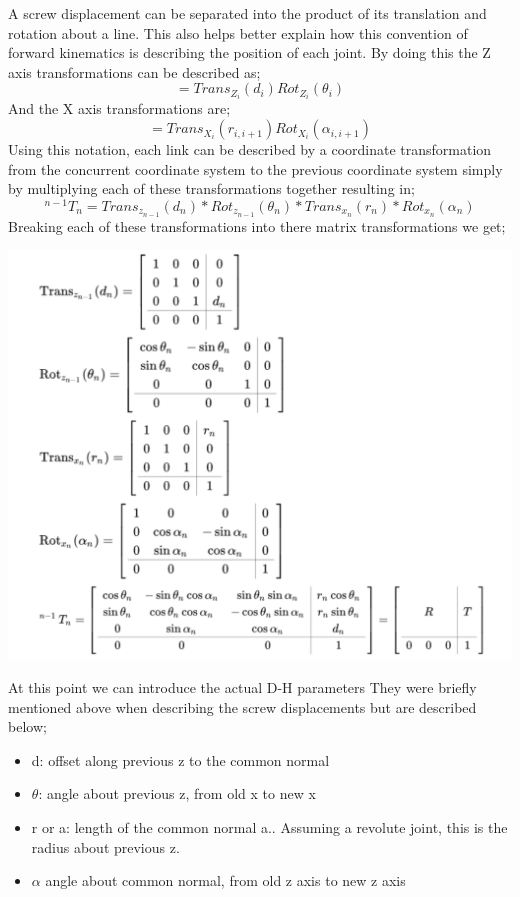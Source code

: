     A screw displacement can be separated into the product of its translation and rotation about a line. This also helps better explain how this convention of forward kinematics is describing the position of each joint. By doing this the Z axis transformations can be described as;
    \begin{equation}
    [Z_i] = Trans_{Z_i}(d_i)Rot_{Z_i}(\theta_i)
    \end{equation}
    And the X axis transformations are;
    \begin{equation}
    [X_i] = Trans_{X_i}(r_{i,i+1})Rot_{X_i}(\alpha_{i,i+1})
    \end{equation}
    Using this notation, each link can be described by a coordinate transformation from the concurrent coordinate system to the previous coordinate system simply by multiplying each of these transformations together resulting in;
    \begin{equation}
    ^{n-1}T_n=Trans_{z_{n-1}}(d_n)*Rot_{z_{n-1}}(\theta_n)*Trans_{x_n}(r_n)*Rot_{x_n}(\alpha_n)
    \end{equation}
    Breaking each of these transformations into there matrix transformations we get;
    \begin{center}
    \includegraphics[width=150mm]{Transformation.PNG}
    \end{center}
    At this point we can introduce the actual D-H parameters They were briefly mentioned above when describing the screw displacements but are described below;
    \begin{itemize}
        \item d: offset along previous  z to the common normal
        \item $\theta$: angle about previous z, from old x to new x
        \item r or a: length of the common normal a.. Assuming a revolute joint, this is the radius about previous z.
        \item $\alpha$ angle about common normal, from old z axis to new z axis
    \end{itemize}
